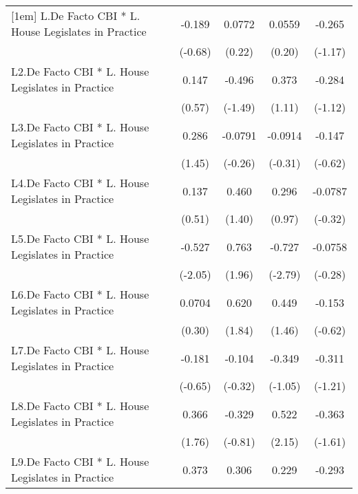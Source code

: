 {\begin{longtable}{l*{4}{c}}
[1em]
L.De Facto CBI * L. House Legislates in Practice&   -0.189         &   0.0772         &   0.0559         &   -0.265         \\
                &  (-0.68)         &   (0.22)         &   (0.20)         &  (-1.17)         \\
[1em]
L2.De Facto CBI * L. House Legislates in Practice&    0.147         &   -0.496         &    0.373         &   -0.284         \\
                &   (0.57)         &  (-1.49)         &   (1.11)         &  (-1.12)         \\
[1em]
L3.De Facto CBI * L. House Legislates in Practice&    0.286         &  -0.0791         &  -0.0914         &   -0.147         \\
                &   (1.45)         &  (-0.26)         &  (-0.31)         &  (-0.62)         \\
[1em]
L4.De Facto CBI * L. House Legislates in Practice&    0.137         &    0.460         &    0.296         &  -0.0787         \\
                &   (0.51)         &   (1.40)         &   (0.97)         &  (-0.32)         \\
[1em]
L5.De Facto CBI * L. House Legislates in Practice&   -0.527\sym{*}  &    0.763         &   -0.727\sym{**} &  -0.0758         \\
                &  (-2.05)         &   (1.96)         &  (-2.79)         &  (-0.28)         \\
[1em]
L6.De Facto CBI * L. House Legislates in Practice&   0.0704         &    0.620         &    0.449         &   -0.153         \\
                &   (0.30)         &   (1.84)         &   (1.46)         &  (-0.62)         \\
[1em]
L7.De Facto CBI * L. House Legislates in Practice&   -0.181         &   -0.104         &   -0.349         &   -0.311         \\
                &  (-0.65)         &  (-0.32)         &  (-1.05)         &  (-1.21)         \\
[1em]
L8.De Facto CBI * L. House Legislates in Practice&    0.366         &   -0.329         &    0.522\sym{*}  &   -0.363         \\
                &   (1.76)         &  (-0.81)         &   (2.15)         &  (-1.61)         \\
[1em]
L9.De Facto CBI * L. House Legislates in Practice&    0.373         &    0.306         &    0.229         &   -0.293         \\

\end{longtable}}

